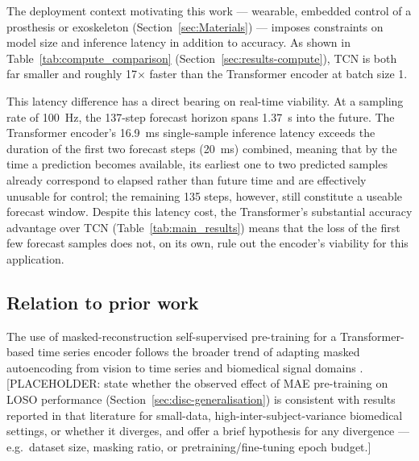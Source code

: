 The deployment context motivating this work — wearable, embedded control of a
prosthesis or exoskeleton (Section~\ref{sec:Materials}) — imposes constraints
on model size and inference latency in addition to accuracy. As shown in
Table~\ref{tab:compute_comparison} (Section~\ref{sec:results-compute}), TCN is
both far smaller and roughly \num{17}$\times$ faster than the Transformer
encoder at batch size 1.

This latency difference has a direct bearing on real-time viability. At a
sampling rate of \SI{100}{\hertz}, the \num{137}-step forecast horizon spans
\SI{1.37}{\second} into the future. The Transformer encoder's
\SI{16.9}{\milli\second} single-sample inference latency exceeds the duration
of the first two forecast steps (\SI{20}{\milli\second}) combined, meaning
that by the time a prediction becomes available, its earliest one to two
predicted samples already correspond to elapsed rather than future time and
are effectively unusable for control; the remaining \num{135} steps, however,
still constitute a useable forecast window. Despite this latency cost, the
Transformer's substantial accuracy advantage over TCN (Table~\ref{tab:main_results})
means that the loss of the first few forecast samples does not, on its own,
rule out the encoder's viability for this application.

\subsection{Relation to prior work}\label{sec:disc-related-work}

The use of masked-reconstruction self-supervised pre-training for a
Transformer-based time series encoder follows the broader trend of adapting
masked autoencoding \cite{PLACEHOLDER} %
from vision to time series and biomedical signal domains
\cite{PLACEHOLDER}. %
[PLACEHOLDER: state whether the observed effect of MAE pre-training on LOSO
performance (Section~\ref{sec:disc-generalisation}) is consistent with results
reported in that literature for small-data, high-inter-subject-variance
biomedical settings, or whether it diverges, and offer a brief hypothesis for
any divergence — e.g.\ dataset size, masking ratio, or pretraining/fine-tuning
epoch budget.]

